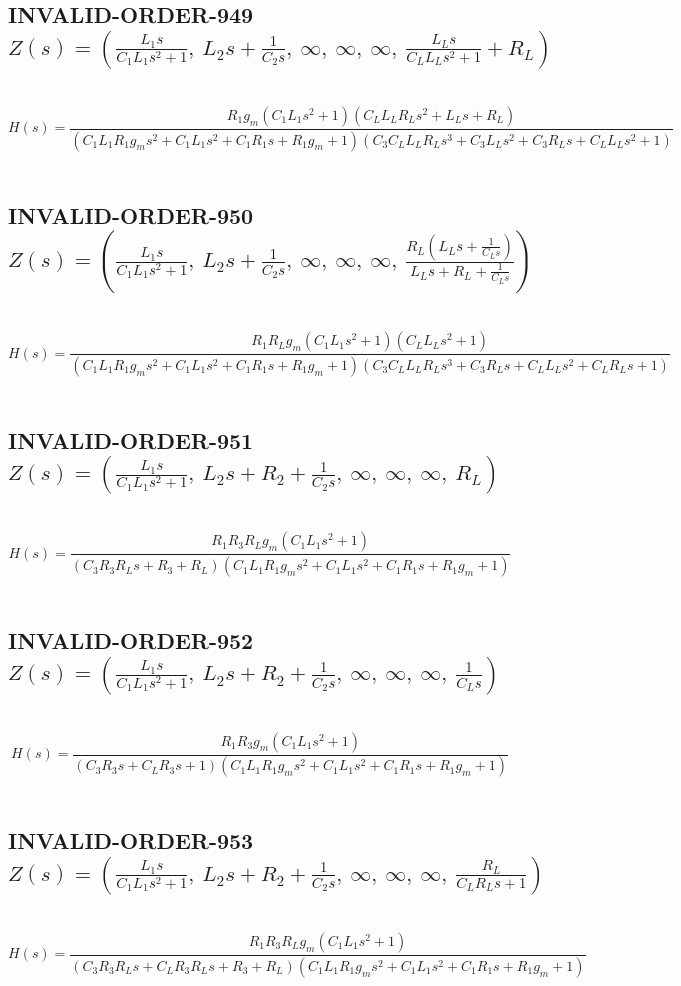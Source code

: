 \documentclass{article}
\begin{document}
\subsection{INVALID-ORDER-949 $Z(s) = \left( \frac{L_{1} s}{C_{1} L_{1} s^{2} + 1}, \  L_{2} s + \frac{1}{C_{2} s}, \  \infty, \  \infty, \  \infty, \  \frac{L_{L} s}{C_{L} L_{L} s^{2} + 1} + R_{L}\right)$ } \ 
\textbf{\[H(s) = \frac{R_{1} g_{m} \left(C_{1} L_{1} s^{2} + 1\right) \left(C_{L} L_{L} R_{L} s^{2} + L_{L} s + R_{L}\right)}{\left(C_{1} L_{1} R_{1} g_{m} s^{2} + C_{1} L_{1} s^{2} + C_{1} R_{1} s + R_{1} g_{m} + 1\right) \left(C_{3} C_{L} L_{L} R_{L} s^{3} + C_{3} L_{L} s^{2} + C_{3} R_{L} s + C_{L} L_{L} s^{2} + 1\right)}\] } \ 
\subsection{INVALID-ORDER-950 $Z(s) = \left( \frac{L_{1} s}{C_{1} L_{1} s^{2} + 1}, \  L_{2} s + \frac{1}{C_{2} s}, \  \infty, \  \infty, \  \infty, \  \frac{R_{L} \left(L_{L} s + \frac{1}{C_{L} s}\right)}{L_{L} s + R_{L} + \frac{1}{C_{L} s}}\right)$ } \ 
\textbf{\[H(s) = \frac{R_{1} R_{L} g_{m} \left(C_{1} L_{1} s^{2} + 1\right) \left(C_{L} L_{L} s^{2} + 1\right)}{\left(C_{1} L_{1} R_{1} g_{m} s^{2} + C_{1} L_{1} s^{2} + C_{1} R_{1} s + R_{1} g_{m} + 1\right) \left(C_{3} C_{L} L_{L} R_{L} s^{3} + C_{3} R_{L} s + C_{L} L_{L} s^{2} + C_{L} R_{L} s + 1\right)}\] } \ 
\subsection{INVALID-ORDER-951 $Z(s) = \left( \frac{L_{1} s}{C_{1} L_{1} s^{2} + 1}, \  L_{2} s + R_{2} + \frac{1}{C_{2} s}, \  \infty, \  \infty, \  \infty, \  R_{L}\right)$ } \ 
\textbf{\[H(s) = \frac{R_{1} R_{3} R_{L} g_{m} \left(C_{1} L_{1} s^{2} + 1\right)}{\left(C_{3} R_{3} R_{L} s + R_{3} + R_{L}\right) \left(C_{1} L_{1} R_{1} g_{m} s^{2} + C_{1} L_{1} s^{2} + C_{1} R_{1} s + R_{1} g_{m} + 1\right)}\] } \ 
\subsection{INVALID-ORDER-952 $Z(s) = \left( \frac{L_{1} s}{C_{1} L_{1} s^{2} + 1}, \  L_{2} s + R_{2} + \frac{1}{C_{2} s}, \  \infty, \  \infty, \  \infty, \  \frac{1}{C_{L} s}\right)$ } \ 
\textbf{\[H(s) = \frac{R_{1} R_{3} g_{m} \left(C_{1} L_{1} s^{2} + 1\right)}{\left(C_{3} R_{3} s + C_{L} R_{3} s + 1\right) \left(C_{1} L_{1} R_{1} g_{m} s^{2} + C_{1} L_{1} s^{2} + C_{1} R_{1} s + R_{1} g_{m} + 1\right)}\] } \ 
\subsection{INVALID-ORDER-953 $Z(s) = \left( \frac{L_{1} s}{C_{1} L_{1} s^{2} + 1}, \  L_{2} s + R_{2} + \frac{1}{C_{2} s}, \  \infty, \  \infty, \  \infty, \  \frac{R_{L}}{C_{L} R_{L} s + 1}\right)$ } \ 
\textbf{\[H(s) = \frac{R_{1} R_{3} R_{L} g_{m} \left(C_{1} L_{1} s^{2} + 1\right)}{\left(C_{3} R_{3} R_{L} s + C_{L} R_{3} R_{L} s + R_{3} + R_{L}\right) \left(C_{1} L_{1} R_{1} g_{m} s^{2} + C_{1} L_{1} s^{2} + C_{1} R_{1} s + R_{1} g_{m} + 1\right)}\] } \ 
\end{document}
